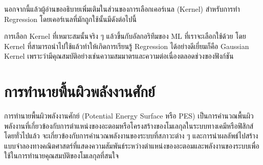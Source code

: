 นอกจากนี้แล้วผู้อ่านขออธิบายเพิ่มเติมในส่วนของการเลือกเคอร์เนล (Kernel) สำหรับการทำ Regression โดยเคอร์เนลที่มักถูกใช้นั้นมีดังต่อไปนี้


การเลือก Kernel ที่เหมาะสมนั้นจริง ๆ แล้วขึ้นกับอัลกอริทึมของ ML ที่เราจะเลือกใช้ด้วย โดย Kernel ที่สามารถนำไปใช้แล้วทำให้เกิดการเรียนรู้ Regression ได้อย่างดีเยี่ยมก็คือ Gaussian Kernel เพราะว่ามีคุณสมบัติอย่างเช่นความสมมาตรและความต่อเนื่องตลอดช่วงของฟังก์ชัน

\section{การทำนายพื้นผิวพลังงานศักย์}
\label{sec:pred_pot_ener}

การทำนายพื้นผิวพลังงานศักย์ (Potential Energy Surface หรือ PES) เป็นการคำนวณพื้นผิวพลังงานที่เกี่ยวข้องกับการตำแหน่งของอะตอมหรือโครงสร้างของโมเลกุลในระบบทางเคมีหรือฟิสิกส์ โดยทั่วไปแล้ว จะเกี่ยวข้องกับการคำนวณพลังงานของระบบที่สภาวะต่าง ๆ และการนำผลลัพธ์ไปสร้างแบบจำลองทางคณิตศาสตร์ที่แสดงความสัมพันธ์ระหว่างตำแหน่งของอะตอมและพลังงานของระบบเพื่อใช้ในการทำนายคุณสมบัติของโมเลกุลที่สนใจ

